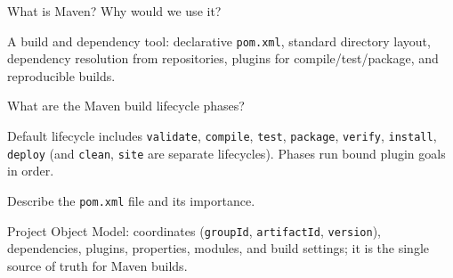 \newpage

\newpage


\question[4]
What is Maven? Why would we use it?
\begin{solutionorbox}[1.25in]
  A build and dependency tool: declarative \texttt{pom.xml}, standard directory layout, dependency resolution from repositories, plugins for compile/test/package, and reproducible builds.
\end{solutionorbox}

\question[4]
What are the Maven build lifecycle phases?
\begin{solutionorbox}[1.35in]
  Default lifecycle includes \texttt{validate}, \texttt{compile}, \texttt{test}, \texttt{package}, \texttt{verify}, \texttt{install}, \texttt{deploy} (and \texttt{clean}, \texttt{site} are separate lifecycles). Phases run bound plugin goals in order.
\end{solutionorbox}

\question[4]
Describe the \texttt{pom.xml} file and its importance.
\begin{solutionorbox}[1.45in]
  Project Object Model: coordinates (\texttt{groupId}, \texttt{artifactId}, \texttt{version}), dependencies, plugins, properties, modules, and build settings; it is the single source of truth for Maven builds.
\end{solutionorbox}


